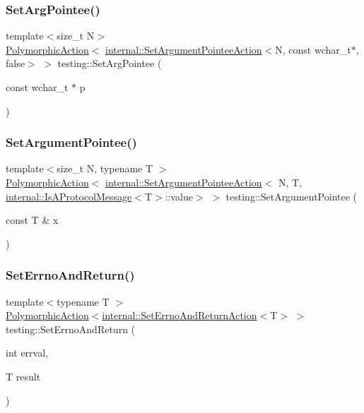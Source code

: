 \subsubsection{\texorpdfstring{Set\+Arg\+Pointee()}{SetArgPointee()}\hspace{0.1cm}{\footnotesize\ttfamily [3/3]}}
{\footnotesize\ttfamily template$<$size\+\_\+t N$>$ \\
\hyperlink{classtesting_1_1_polymorphic_action}{Polymorphic\+Action}$<$ \hyperlink{classtesting_1_1internal_1_1_set_argument_pointee_action}{internal\+::\+Set\+Argument\+Pointee\+Action}$<$N, const wchar\+\_\+t$\ast$, false$>$ $>$ testing\+::\+Set\+Arg\+Pointee (\begin{DoxyParamCaption}\item[{const wchar\+\_\+t $\ast$}]{p }\end{DoxyParamCaption})}

\mbox{\label{namespacetesting_a03b315d27c91a8e719f2b6c09964130b}} 
\subsubsection{\texorpdfstring{Set\+Argument\+Pointee()}{SetArgumentPointee()}}
{\footnotesize\ttfamily template$<$size\+\_\+t N, typename T $>$ \\
\hyperlink{classtesting_1_1_polymorphic_action}{Polymorphic\+Action}$<$ \hyperlink{classtesting_1_1internal_1_1_set_argument_pointee_action}{internal\+::\+Set\+Argument\+Pointee\+Action}$<$ N, T, \hyperlink{structtesting_1_1internal_1_1_is_a_protocol_message}{internal\+::\+Is\+A\+Protocol\+Message}$<$T$>$\+::value$>$ $>$ testing\+::\+Set\+Argument\+Pointee (\begin{DoxyParamCaption}\item[{const T \&}]{x }\end{DoxyParamCaption})}

\mbox{\label{namespacetesting_a31095e421f167fade2e6d4d60df1f4da}} 
\subsubsection{\texorpdfstring{Set\+Errno\+And\+Return()}{SetErrnoAndReturn()}}
{\footnotesize\ttfamily template$<$typename T $>$ \\
\hyperlink{classtesting_1_1_polymorphic_action}{Polymorphic\+Action}$<$\hyperlink{classtesting_1_1internal_1_1_set_errno_and_return_action}{internal\+::\+Set\+Errno\+And\+Return\+Action}$<$T$>$ $>$ testing\+::\+Set\+Errno\+And\+Return (\begin{DoxyParamCaption}\item[{int}]{errval,  }\item[{T}]{result }\end{DoxyParamCaption})}

